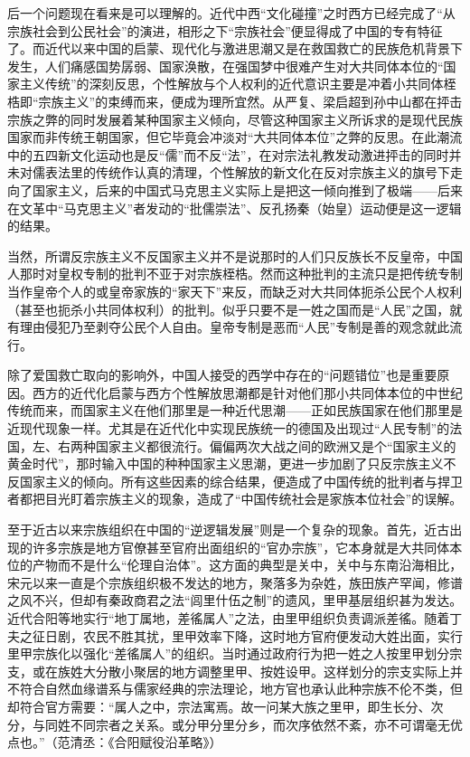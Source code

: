 \documentclass[a4paper,12pt,punct=kaiming]{ctexart}
\begin{document}
后一个问题现在看来是可以理解的。近代中西“文化碰撞”之时西方已经完成了“从宗族社会到公民社会”的演进，相形之下“宗族社会”便显得成了中国的专有特征了。而近代以来中国的启蒙、现代化与激进思潮又是在救国救亡的民族危机背景下发生，人们痛感国势孱弱、国家涣散，在强国梦中很难产生对大共同体本位的“国家主义传统”的深刻反思，个性解放与个人权利的近代意识主要是冲着小共同体桎梏即“宗族主义”的束缚而来，便成为理所宜然。从严复、梁启超到孙中山都在抨击宗族之弊的同时发展着某种国家主义倾向，尽管这种国家主义所诉求的是现代民族国家而非传统王朝国家，但它毕竟会冲淡对“大共同体本位”之弊的反思。在此潮流中的五四新文化运动也是反“儒”而不反“法”，在对宗法礼教发动激进抨击的同时并未对儒表法里的传统作认真的清理，个性解放的新文化在反对宗族主义的旗号下走向了国家主义，后来的中国式马克思主义实际上是把这一倾向推到了极端——后来在文革中“马克思主义”者发动的“批儒崇法”、反孔扬秦（始皇）运动便是这一逻辑的结果。

当然，所谓反宗族主义不反国家主义并不是说那时的人们只反族长不反皇帝，中国人那时对皇权专制的批判不亚于对宗族桎梏。然而这种批判的主流只是把传统专制当作皇帝个人的或皇帝家族的“家天下”来反，而缺乏对大共同体扼杀公民个人权利（甚至也扼杀小共同体权利）的批判。似乎只要不是一姓之国而是“人民”之国，就有理由侵犯乃至剥夺公民个人自由。皇帝专制是恶而“人民”专制是善的观念就此流行。

除了爱国救亡取向的影响外，中国人接受的西学中存在的“问题错位”也是重要原因。西方的近代化启蒙与西方个性解放思潮都是针对他们那小共同体本位的中世纪传统而来，而国家主义在他们那里是一种近代思潮——正如民族国家在他们那里是近现代现象一样。尤其是在近代化中实现民族统一的德国及出现过“人民专制”的法国，左、右两种国家主义都很流行。偏偏两次大战之间的欧洲又是个“国家主义的黄金时代”，那时输入中国的种种国家主义思潮，更进一步加剧了只反宗族主义不反国家主义的倾向。所有这些因素的综合结果，便造成了中国传统的批判者与捍卫者都把目光盯着宗族主义的现象，造成了“中国传统社会是家族本位社会”的误解。

至于近古以来宗族组织在中国的“逆逻辑发展”则是一个复杂的现象。首先，近古出现的许多宗族是地方官僚甚至官府出面组织的“官办宗族”，它本身就是大共同体本位的产物而不是什么“伦理自治体”。这方面的典型是关中，关中与东南沿海相比，宋元以来一直是个宗族组织极不发达的地方，聚落多为杂姓，族田族产罕闻，修谱之风不兴，但却有秦政商君之法“闾里什伍之制”的遗风，里甲基层组织甚为发达。近代合阳等地实行“地丁属地，差徭属人”之法，由里甲组织负责调派差徭。随着丁夫之征日剧，农民不胜其扰，里甲效率下降，这时地方官府便发动大姓出面，实行里甲宗族化以强化“差徭属人”的组织。当时通过政府行为把一姓之人按里甲划分宗支，或在族姓大分散小聚居的地方调整里甲、按姓设甲。这样划分的宗支实际上并不符合自然血缘谱系与儒家经典的宗法理论，地方官也承认此种宗族不伦不类，但却符合官方需要：“属人之中，宗法寓焉。故一问某大族之里甲，即生长分、次分，与同姓不同宗者之关系。或分甲分里分乡，而次序依然不紊，亦不可谓毫无优点也。”（范清丞：《合阳赋役沿革略》）
\end{document}
